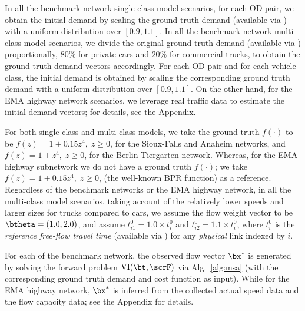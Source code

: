 \documentclass[3p]{elsarticle}
\begin{document}
In all the benchmark network single-class model scenarios, for each OD
pair, we obtain the initial demand by scaling the ground truth demand
(available via \cite{BarGera16}) with a uniform distribution over $[0.9,
1.1]$.  In all the benchmark network multi-class model scenarios, we
divide the original ground truth demand (available via \cite{BarGera16})
proportionally, $80\%$ for private cars and $20\%$ for commercial
trucks, to obtain the ground truth demand vectors accordingly. For each
OD pair and for each vehicle class, the initial demand is obtained by
scaling the corresponding ground truth demand with a uniform
distribution over $[0.9, 1.1]$. On the other hand, for the EMA highway
network scenarios, we leverage real traffic data to estimate the initial
demand vectors; for details, see the Appendix.


For both single-class and multi-class models, we take the ground truth
$f\left(\cdot\right)$ to be $f\left(z\right) = 1 + 0.15z^4, \;z \geq 0$,
for the Sioux-Falls and Anaheim networks, and $f\left(z\right) = 1 +
z^4, \;z \geq 0$, for the Berlin-Tiergarten network. Whereas, for the
EMA highway subnetwork we do not have a ground truth
$f\left(\cdot\right)$; we take $f\left(z\right) = 1 + 0.15z^4, \;z \geq
0$, (the well-known BPR function) as a reference. Regardless of the
benchmark networks or the EMA highway network, in all the multi-class
model scenarios, taking account of the relatively lower speeds and
larger sizes for trucks compared to cars, we assume the flow weight
vector to be $\btheta = (1.0, 2.0)$, and assume ${t^{{0}}_{i1}} = 1.0
\times t^{{0}}_{i}$ and ${t^{{0}}_{i2}} = 1.1 \times t^{{0}}_{i}$, where
$t^{{0}}_{i}$ is the \textit{reference free-flow travel time} (available
via \cite{BarGera16}) for any \textit{physical} link indexed by $i$.

For each of the benchmark network, the observed flow vector ${\bx^*}$ is
generated by solving the forward problem $\text{VI}(\bt,\scrF)$ via
Alg.~\ref{alg:msa} (with the corresponding ground truth demand and cost
function as input). While for the EMA highway network, ${\bx^*}$ is
inferred from the collected actual speed data and the flow capacity
data; see the Appendix for details.
\end{document}
